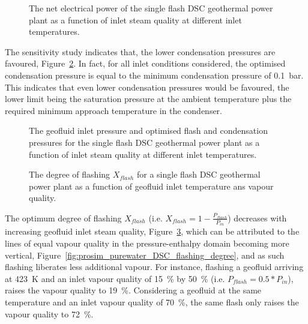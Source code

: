     \begin{figure}[H]
        \centering
        
        \caption{The net electrical power of the single flash \ac{DSC} geothermal power plant as a function of inlet steam quality at different inlet temperatures.}
        \label{fig:prosim_purewater_DSC_Wnet}
    \end{figure}

    The sensitivity study indicates that, the lower condensation pressures are favoured, Figure~\ref{fig:prosim_purewater_DSC_OPs}. In fact, for all inlet conditions considered, the optimised condensation pressure is equal to the minimum condensation pressure of \qty{0.1}{\bar}. This indicates that even lower condensation pressures would be favoured, the lower limit being the saturation pressure at the ambient temperature plus the required minimum approach temperature in the condenser.

    \begin{figure}[H]
        \centering
        
        \caption[The geofluid inlet pressure and optimised flash and condensation pressures for the single flash \ac{DSC} geothermal power plant.]{The geofluid inlet pressure and optimised flash and condensation pressures for the single flash \ac{DSC} geothermal power plant as a function of inlet steam quality at different inlet temperatures.}
        \label{fig:prosim_purewater_DSC_OPs}
    \end{figure}

    \begin{figure}[H]
        \centering
        
        \caption{The degree of flashing \(X_{flash}\) for a single flash \ac{DSC} geothermal power plant as a function of geofluid inlet temperature ans vapour quality.}
        \label{fig:prosim_purewater_DSC_flash_region}
    \end{figure}

    The optimum degree of flashing \(X_{flash}\) (i.e. \(X_{flash}=1- \frac{P_{flash}}{P_{in}}\)) decreases with increasing geofluid inlet steam quality, Figure~\ref{fig:prosim_purewater_DSC_flash_region}, which can be attributed to the lines of equal vapour quality in the pressure-enthalpy domain becoming more vertical, Figure~\ref{fig:prosim_purewater_DSC_flashing_degree}, and as such flashing liberates less additional vapour. For instance, flashing a geofluid arriving at \qty{423}{\K} and an inlet vapour quality of \qty{15}{\percent} by \qty{50}{\percent} (i.e. \(P_{flash}=0.5*P_{in}\)), raises the vapour quality to \qty{19}{\percent}. Considering a geofluid at the same temperature and an inlet vapour quality of \qty{70}{\percent}, the same flash only raises the vapour quality to \qty{72}{\percent}.
            
